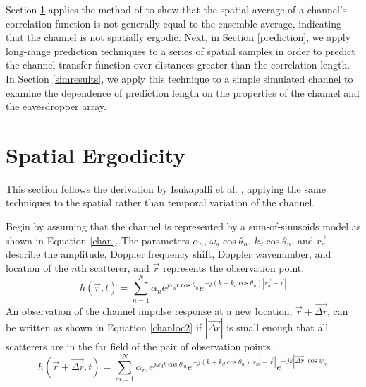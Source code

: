 \documentclass[11pt]{article} %
\begin{document}
Section \ref{ergodicity} applies the method of \cite{isukapalli} to show that the spatial average of a channel's correlation function is not generally equal to the ensemble average, indicating that the channel is not spatially ergodic. Next, in Section \ref{prediction}, we apply long-range prediction techniques to a series of spatial samples in order to predict the channel transfer function over distances greater than the correlation length.  In Section \ref{simresults}, we apply this technique to a simple simulated channel to examine the dependence of prediction length on the properties of the channel and the eavesdropper array. %


\section{Spatial Ergodicity}\label{ergodicity}


This section follows the derivation by Isukapalli et al. \cite{isukapalli}, applying the same techniques to the spatial rather than temporal variation of the channel.

Begin by assuming that the channel is represented by a sum-of-sinusoids model as shown in Equation \ref{chan}.  The parameters $\alpha_n$, $\omega_d\cos\theta_n$, $k_d\cos\theta_n$, and $\vec{r_n}$ describe the amplitude, Doppler frequency shift, Doppler wavenumber, and location of the $n$th scatterer, and $\vec{r}$ represents the observation point.
\begin{equation}\label{chan}
h(\vec{r},t)= \sum_{n=1}^N \alpha_n e^{j \omega_d t \cos \theta_n} e^{-j(k+k_d\cos\theta_n)\left|\vec{r_n} - \vec{r}\right|}
\end{equation}
An observation of the channel impulse response at a new location, $\vec{r}+\vec{\Delta r}$, can be written as shown in Equation \ref{chanloc2} if $|\vec{\Delta r}|$ is small enough that all scatterers are in the far field of the pair of observation points.
\begin{equation}\label{chanloc2}
h(\vec{r}+\vec{\Delta r},t) = \sum_{m=1}^N \alpha_m e^{j \omega_d t \cos \theta_m} e^{-j(k+k_d\cos\theta_n)\left|\vec{r_m}-\vec{r}\right|}e^{-jk\left|\vec{\Delta r}\right| \cos \psi_m}
\end{equation}
\end{document}
